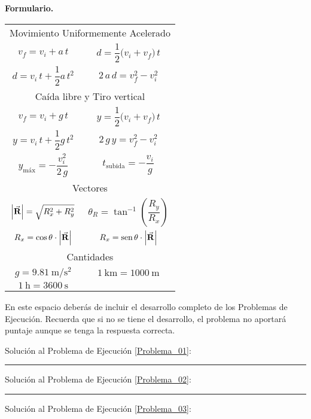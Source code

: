 \documentclass[12pt, letter]{exam}
\begin{document}
\newpage

\textbf{\huge{Formulario.}}
\begin{table}[H]
    \centering
    \setlength{\tabcolsep}{40pt}
    \renewcommand{\arraystretch}{2.5}
    \begin{tabular}{c  c}
        \multicolumn{2}{c}{Movimiento Uniformemente Acelerado} \\
        $v_{f} = v_{i} + a \, t$ & $d = \dfrac{1}{2} \big( v_{i} + v_{f} \big) \, t$ \\
        $d = v_{i} \, t + \dfrac{1}{2} a \, t^{2}$ & $2 \, a \, d = v_{f}^{2} - v_{i}^{2}$ \\ \hline
        \multicolumn{2}{c}{Caída libre y Tiro vertical} \\
        $v_{f} = v_{i} + g \, t$ & $y = \dfrac{1}{2} \big( v_{i} + v_{f} \big) \, t$ \\
        $y = v_{i} \, t + \dfrac{1}{2} g \, t^{2}$ & $2 \, g \, y = v_{f}^{2} - v_{i}^{2}$ \\ 
        $y_{\text{máx}} = - \dfrac{v_{i}^{2}}{2 \, g}$ & $t_{\text{subida}} = - \dfrac{v_{i}}{g}$ \\ \hline
        \multicolumn{2}{c}{Vectores} \\
        $\abs{\va{R}} = \sqrt{R_{x}^{2} + R_{y}^{2}}$ & $\theta_{R} = \tan^{-1} \left( \dfrac{R_{y}}{R_{x}} \right)$ \\
        $R_{x} = \cos \theta \cdot \abs{\va{R}}$ & $R_{x} = \text{sen} \, \theta \cdot \abs{\va{R}}$ \\ \hline
        \multicolumn{2}{c}{Cantidades} \\
        $g = \SI{9.81}{\meter\per\square\second}$ & $\SI{1}{\kilo\meter} = \SI{1000}{\meter}$  \\
        $\SI{1}{\hour} = \SI{3600}{\second}$ &
\end{tabular}
\end{table}

\newpage
En este espacio deberás de incluir el desarrollo completo de los Problemas de Ejecución. Recuerda que si no se tiene el desarrollo, el problema no aportará puntaje aunque se tenga la respuesta correcta.

\vspace*{0.5cm}
Solución al Problema de Ejecución \ref{Problema_01}:

\vspace*{6cm}
\rule{0.9\textwidth}{0.3mm}

Solución al Problema de Ejecución \ref{Problema_02}:

\vspace*{6cm}
\rule{0.9\textwidth}{0.3mm}

Solución al Problema de Ejecución \ref{Problema_03}:
\end{document}
